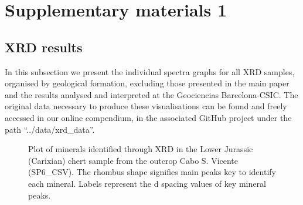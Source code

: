 \documentclass[
  a4paper,
  DIV=11,
  numbers=noendperiod]{scrreprt}
\begin{document}
\cleardoublepage
{}
{}
\appendix

\chapter{Supplementary materials 1}\label{supplementary-materials-1}

\section{XRD results}\label{xrd-results}

In this subsection we present the individual spectra graphs for all XRD
samples, organised by geological formation, excluding those presented in
the main paper and the results analysed and interpreted at the
Geociencias Barcelona-CSIC. The original data necessary to produce these
visualisations can be found and freely accessed in our online
compendium, in the associated GitHub project under the path
``../data/xrd\_data''.

\begin{figure}


\caption{\label{fig-xrd-sp6}Plot of minerals identified through XRD in
the Lower Jurassic (Carixian) chert sample from the outcrop Cabo S.
Vicente (SP6\_CSV). The rhombus shape signifies main peaks key to
identify each mineral. Labels represent the d spacing values of key
mineral peaks.}

\end{figure}%
\end{document}

